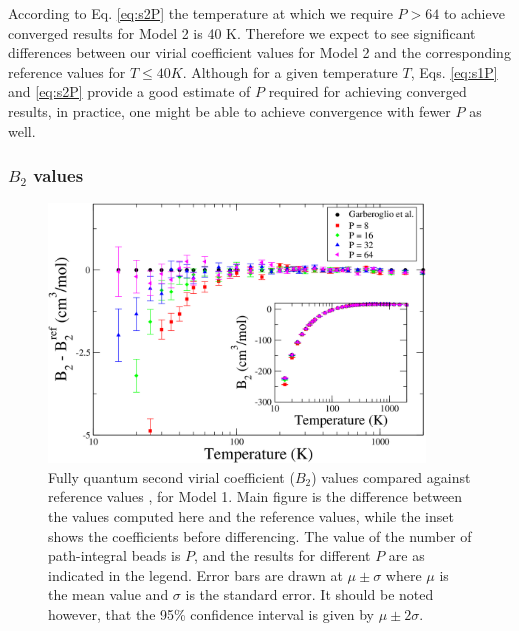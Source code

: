             According to Eq. \eqref{eq:s2P} the temperature at which we require $P > 64$ to achieve converged results for Model 2 is 40 K. Therefore we expect to see significant differences between our virial coefficient values for Model 2 and the corresponding reference values for $T \le 40 K$. Although for a given temperature $T$, Eqs. \eqref{eq:s1P} and \eqref{eq:s2P} provide a good estimate of $P$ required for achieving converged results, in practice, one might be able to achieve convergence with fewer $P$ as well.

            \subsubsection{$B_2$ values}
                \begin{figure}[!htbp]
                    \centering
                    \includegraphics[width=10cm,keepaspectratio]{Chapter-4/Figures/s1GarberoglioAll.png}
                    \caption{Fully quantum second virial coefficient ($B_2$) values compared against reference values \cite{Garberoglio2014}, for Model 1. Main figure is the difference between the values computed here and the reference values, while the inset shows the coefficients before differencing. The value of the number of path-integral beads is $P$, and the results for different $P$ are as indicated in the legend. Error bars are drawn at $\mu \pm \sigma$ where $\mu$ is the mean value and $\sigma$ is the standard error. It should be noted however, that the 95\% confidence interval is given by $\mu \pm 2\sigma$.}
                    \label{fig:r0}
                \end{figure}
